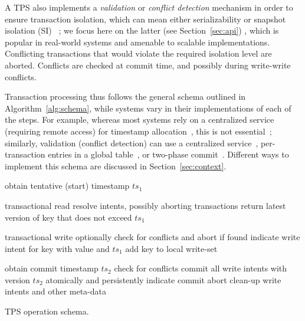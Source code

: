 { 
  




A TPS also implements  a \emph{validation} or \emph{conflict detection} mechanism in order to ensure transaction isolation, which can mean
either serializability or snapshot isolation (SI) ~\cite{DBLP:conf/sigmod/BerensonBGMOO95}; we focus here on the
latter (see Section~\ref{sec:api}) ,  which is popular in real-world systems  and amenable to scalable implementations.
Conflicting transactions that would violate the required isolation level are
aborted. Conflicts are checked at commit time, and possibly during write-write conflicts.

Transaction processing thus follows the general schema outlined in Algorithm~\ref{alg:schema}, 
while systems vary in their implementations of each of the steps. 
For example, whereas most systems rely on a centralized service (requiring remote access) for timestamp allocation~\cite{OmidICDE2014,omid-blog,tephra,Percolator2010}, this is not essential~\cite{cockroach}; similarly, validation (conflict detection) can use a centralized service~\cite{OmidICDE2014,omid-blog,tephra}, per-transaction entries in a global table~\cite{cockroach}, or two-phase commit~\cite{Percolator2010}. 
Different ways to implement this schema are  discussed in Section~\ref{sec:context}.
 
\begin{algorithm}[tb]
\begin{algorithmic}[1]
\State obtain tentative (start) timestamp $ts_1$ 
\EndProcedure
\Statex

 \Comment transactional read
	\State resolve intents, possibly  aborting transactions \label{l:resolve}
\EndIf
\State return latest version of key that does not exceed $ts_1$
\EndProcedure
\Statex

 \Comment transactional write
\State optionally check for conflicts and abort if found 
\State indicate write intent for key with value and $ts_1$
\State add key to local write-set
\EndProcedure
\Statex

\State obtain commit timestamp $ts_2$
  \Comment check for conflicts  \label{l:validate}
	\Statex \Comment commit all write intents with version $ts_2$
	\State atomically and persistently indicate commit   \label{l:commit}
\Else
	\State abort	
\EndIf
\State clean-up write intents and other meta-data
\EndProcedure
\end{algorithmic}
\caption{TPS operation schema.} 
\label{alg:schema}
\end{algorithm} 

}

